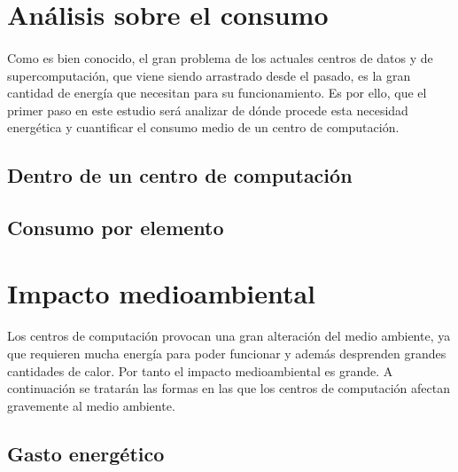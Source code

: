 \documentclass[10pt]{article}
\begin{document}
  \section{Análisis sobre el consumo}
  \label{sec:analisis}
  	\paragraph{}
		Como es bien conocido, el gran problema de los actuales centros de datos y de supercomputación, que viene siendo arrastrado desde el pasado, es la gran cantidad de energía que necesitan para su funcionamiento. Es por ello, que el primer paso en este estudio será analizar de dónde procede esta necesidad energética y cuantificar el consumo medio de un centro de computación.

    \subsection{Dentro de un centro de computación}
			\paragraph{}

   \subsection{Consumo por elemento}
			\paragraph{}

  \section{Impacto medioambiental}
	\label{sec:impacto}

    \paragraph{}
		Los centros de computación provocan una gran alteración del medio ambiente, ya que requieren mucha energía para poder funcionar y además desprenden grandes cantidades de calor. Por tanto el impacto medioambiental es grande. A continuación se tratarán las formas en las que los centros de computación afectan gravemente al medio ambiente.

    \subsection{Gasto energético}
\end{document}

